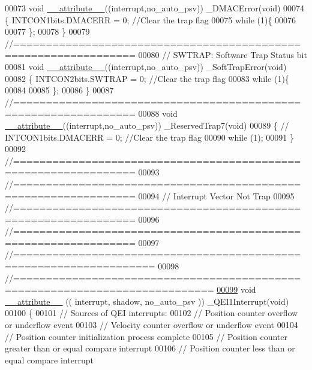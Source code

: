 \begin{DoxyCode}
00073 \textcolor{keywordtype}{void} \hyperlink{a00070_a226557d5e42f7e29ddaff30606138459}{\_\_attribute\_\_}((interrupt,no\_auto\_psv)) \_DMACError(\textcolor{keywordtype}{void})
00074 \{   INTCON1bits.DMACERR = 0; \textcolor{comment}{//Clear the trap flag}
00075 \textcolor{keywordflow}{while} (1)\{
00076    
00077 \};
00078 \}
00079 \textcolor{comment}{//================================================================}
00080 \textcolor{comment}{// SWTRAP: Software Trap Status bit}
00081 \textcolor{keywordtype}{void} \hyperlink{a00070_a226557d5e42f7e29ddaff30606138459}{\_\_attribute\_\_}((interrupt,no\_auto\_psv)) \_SoftTrapError(\textcolor{keywordtype}{void})
00082 \{   INTCON2bits.SWTRAP = 0; \textcolor{comment}{//Clear the trap flag}
00083 \textcolor{keywordflow}{while} (1)\{
00084   
00085 \};
00086 \}
00087 \textcolor{comment}{//================================================================}
00088 \textcolor{keywordtype}{void} \hyperlink{a00070_a226557d5e42f7e29ddaff30606138459}{\_\_attribute\_\_}((interrupt,no\_auto\_psv)) \_ReservedTrap7(\textcolor{keywordtype}{void})
00089 \{   \textcolor{comment}{// INTCON1bits.DMACERR = 0; //Clear the trap flag}
00090 \textcolor{keywordflow}{while} (1);
00091 \}
00092 \textcolor{comment}{//================================================================}
00093 \textcolor{comment}{//================================================================}
00094 \textcolor{comment}{// Interrupt Vector Not Trap}
00095 \textcolor{comment}{//================================================================}
00096 \textcolor{comment}{//================================================================}
00097 \textcolor{comment}{//===================================================================}
00098 \textcolor{comment}{//============================================================================}
\hypertarget{a00070_source_l00099}{}\hyperlink{a00070_afe092795b3220f38b62c7e90763e2f30}{00099} \textcolor{keywordtype}{void} \hyperlink{a00070_a226557d5e42f7e29ddaff30606138459}{\_\_attribute\_\_} (( interrupt, shadow, no\_auto\_psv )) \_QEI1Interrupt(\textcolor{keywordtype}{void})
00100 \{
00101 \textcolor{comment}{// Sources of QEI interrupts:}
00102 \textcolor{comment}{// Position counter overflow or underflow event}
00103 \textcolor{comment}{// Velocity counter overflow or underflow event}
00104 \textcolor{comment}{// Position counter initialization process complete}
00105 \textcolor{comment}{// Position counter greater than or equal compare interrupt }
00106 \textcolor{comment}{// Position counter less than or equal compare interrupt}

\end{DoxyCode}
